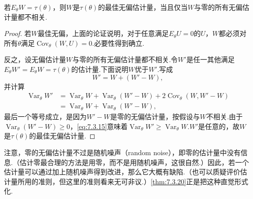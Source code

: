 \begin{theorem}\label{thm:7.3.20}
若$E_\theta W=\tau(\theta)$，则$W$是$\tau(\theta)$的最佳无偏估计量，当且仅当$W$与零的所有无偏估计量都不相关.
\end{theorem}
\begin{proof}
若$W$最佳无偏，上面的论证说明，对于任意满足$E_\theta U=0$的$U$，$W$都必须对所有$\theta$满足$\operatorname{Cov}_\theta(W,U)=0$.必要性得到确立.

反之，设无偏估计量$W$与零的所有无偏估计量都不相关.令$W'$是任一其他满足$E_\theta W'=E_\theta W=\tau(\theta)$的估计量.下面说明$W$优于$W'$.写成
$$W'=W+(W'-W),$$
并计算
\begin{equation}\label{eq:7.3.15}
\begin{aligned}
\operatorname{Var}_\theta W'&=\operatorname{Var}_\theta W+\operatorname{Var}_\theta(W'-W)+2\operatorname{Cov}_\theta(W,W'-W)\\
&=\operatorname{Var}_\theta W+\operatorname{Var}_\theta(W'-W),
\end{aligned}
\end{equation}
最后一个等号成立，是因为$W'-W$是零的无偏估计量，按假设与$W$不相关.由于$\operatorname{Var}_\theta(W'-W)\ge0$，\eqref{eq:7.3.15}意味着$\operatorname{Var}_\theta W'\ge\operatorname{Var}_\theta W$.$W'$是任意的，故$W$是$\tau(\theta)$的最佳无偏估计量.
\end{proof}
注意，零的无偏估计量不过是随机噪声（random noise），即零的估计量中没有信息.（估计零最合理的方法是用零，而不是用随机噪声，这很自然.）因此，若一个估计量可以通过加上随机噪声得到改进，那么它大概有缺陷.（也可以质疑评价估计量所用的准则，但这里的准则看来无可非议.）\autoref{thm:7.3.20}正是把这种直觉形式化.

